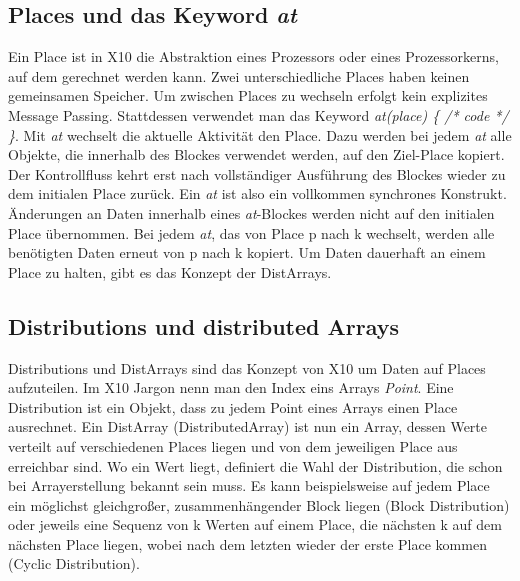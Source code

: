 \subsection{Places und das Keyword \textit{at}} %
\label{sub:places_und_das_keyword_at}
Ein Place ist in X10 die Abstraktion eines Prozessors oder eines Prozessorkerns, auf dem gerechnet werden kann. Zwei unterschiedliche Places haben keinen gemeinsamen Speicher. Um zwischen Places zu wechseln erfolgt kein explizites Message Passing. Stattdessen verwendet man das Keyword \textit{at(place) \{ /* code */ \}}. Mit \textit{at} wechselt die aktuelle Aktivität den Place. Dazu werden bei jedem \textit{at} alle Objekte, die innerhalb des Blockes verwendet werden, auf den Ziel-Place kopiert. Der Kontrollfluss kehrt erst nach vollständiger Ausführung des Blockes wieder zu dem initialen Place zurück. Ein \textit{at} ist also ein vollkommen synchrones Konstrukt. Änderungen an Daten innerhalb eines \textit{at}-Blockes werden nicht auf den initialen Place übernommen. Bei jedem \textit{at}, das von Place p nach k wechselt, werden alle benötigten Daten erneut von p nach k kopiert. Um Daten dauerhaft an einem Place zu halten, gibt es das Konzept der DistArrays.\cite{x10Spec:2012:Online}

\subsection{Distributions und distributed Arrays} %
\label{sub:distributions_und_distributed_arrays}
Distributions und DistArrays sind das Konzept von X10 um Daten auf Places aufzuteilen. Im X10 Jargon nenn man den Index eins Arrays \textit{Point}. Eine Distribution ist ein Objekt, dass zu jedem Point eines Arrays einen Place ausrechnet. Ein DistArray (DistributedArray) ist nun ein Array, dessen Werte verteilt auf verschiedenen Places liegen und von dem jeweiligen Place aus erreichbar sind. Wo ein Wert liegt, definiert die Wahl der Distribution, die schon bei Arrayerstellung bekannt sein muss. Es kann beispielsweise auf jedem Place ein möglichst gleichgroßer, zusammenhängender Block liegen (Block Distribution) oder jeweils eine Sequenz von k Werten auf einem Place, die nächsten k auf dem nächsten Place liegen, wobei nach dem letzten wieder der erste Place kommen (Cyclic Distribution).\cite{x10Spec:2012:Online}


